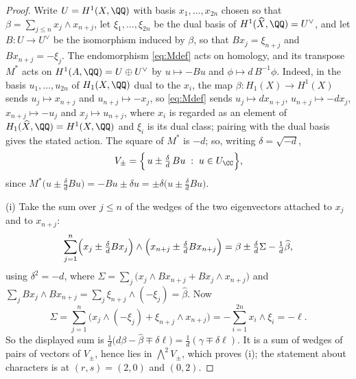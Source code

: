 \begin{proof}
Write $U=H^{1}(X,\QQ)$ with basis $x_{1},\dots,x_{2n}$ chosen so that
$\beta=\sum_{j\le n}x_{j}\wedge x_{n+j}$, let $\xi_{1},\dots,\xi_{2n}$ be the
dual basis of $H^{1}(\widehat{X},\QQ)=U^{\vee}$, and let $B\colon U\to U^{\vee}$
be the isomorphism induced by $\beta$, so that $Bx_{j}=\xi_{n+j}$ and
$Bx_{n+j}=-\xi_{j}$. The endomorphism \eqref{eq:Mdef} acts on homology, and
its transpose $M^{*}$ acts on $H^{1}(A,\QQ)=U\oplus U^{\vee}$ by
$u\mapsto -Bu$ and $\phi\mapsto d\,B^{-1}\phi$. Indeed, in the basis
$u_{1},\dots,u_{2n}$ of $H_{1}(X,\QQ)$ dual to the $x_{i}$, the map
$\beta\colon H_{1}(X)\to H^{1}(X)$ sends $u_{j}\mapsto x_{n+j}$ and
$u_{n+j}\mapsto-x_{j}$, so \eqref{eq:Mdef} sends $u_{j}\mapsto dx_{n+j}$,
$u_{n+j}\mapsto-dx_{j}$, $x_{n+j}\mapsto-u_{j}$ and $x_{j}\mapsto u_{n+j}$,
where $x_{i}$ is regarded as an element of
$H_{1}(\widehat X,\QQ)=H^{1}(X,\QQ)$ and $\xi_{i}$ is its dual class; pairing
with the dual basis gives the stated action. The square of $M^{*}$ is $-d$;
so, writing $\delta=\sqrt{-d}$,
\begin{equation}\label{eq:splitVpm}
  V_{\pm}=\Bigl\{\,u\pm\tfrac{\delta}{d}\,Bu\;:\;u\in U_{\CC}\Bigr\},
\end{equation}
since $M^{*}\bigl(u\pm\tfrac{\delta}{d}Bu\bigr)
=-Bu\pm\delta u=\pm\delta\bigl(u\pm\tfrac{\delta}{d}Bu\bigr)$.

(i) Take the sum over $j\le n$ of the wedges of the two eigenvectors attached
to $x_{j}$ and to $x_{n+j}$:
\[
  \sum_{j=1}^{n}
  \Bigl(x_{j}\pm\tfrac{\delta}{d}Bx_{j}\Bigr)\wedge
  \Bigl(x_{n+j}\pm\tfrac{\delta}{d}Bx_{n+j}\Bigr)
  =\beta\pm\tfrac{\delta}{d}\Sigma-\tfrac{1}{d}\widehat{\beta},
\]
using $\delta^{2}=-d$, where
$\Sigma=\sum_{j}\bigl(x_{j}\wedge Bx_{n+j}+Bx_{j}\wedge x_{n+j}\bigr)$ and
$\sum_{j}Bx_{j}\wedge Bx_{n+j}=\sum_{j}\xi_{n+j}\wedge(-\xi_{j})
=\widehat{\beta}$. Now
\[
  \Sigma=\sum_{j=1}^{n}\bigl(x_{j}\wedge(-\xi_{j})
        +\xi_{n+j}\wedge x_{n+j}\bigr)
   =-\sum_{i=1}^{2n}x_{i}\wedge\xi_{i}=-\ell .
\]
So the displayed sum is $\tfrac1d\bigl(d\beta-\widehat{\beta}\mp\delta\ell\bigr)
=\tfrac1d(\gamma\mp\delta\ell)$. It is a sum of wedges of pairs of vectors of
$V_{\pm}$, hence lies in $\bigwedge^{2}V_{\pm}$, which proves (i); the
statement about characters is  at $(r,s)=(2,0)$ and
$(0,2)$.


\end{proof}
